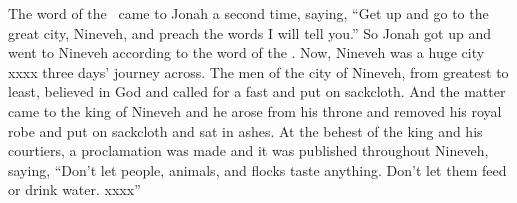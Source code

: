 
\begin{inparaenum}
   The word of the \lord\ came to Jonah a second time, saying,%
   ``Get up and go to the great city, Nineveh, and preach the words I will tell you.''%
   So Jonah got up and went to Nineveh according to the word of the \lord. Now, Nineveh was a huge city xxxx three days' journey across.\understood{}%
   The men of the city of Nineveh, from greatest to least, believed in God and called for a fast and put on sackcloth.%
   And the matter came to the king of Nineveh and he arose from his throne and removed his royal robe and put on sackcloth and sat in ashes.%
   At the behest of the king and his courtiers, a proclamation was made and it was published throughout Nineveh, saying, ``Don't let people, animals, and flocks taste anything. Don't let them feed or drink water.%
   xxxx''%
\end{inparaenum}
